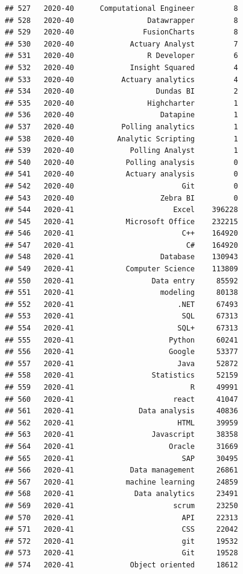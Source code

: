 \documentclass[
]{article}
\begin{document}
\begin{verbatim}
## 527   2020-40      Computational Engineer         8
## 528   2020-40                 Datawrapper         8
## 529   2020-40                FusionCharts         8
## 530   2020-40             Actuary Analyst         7
## 531   2020-40                 R Developer         6
## 532   2020-40             Insight Squared         4
## 533   2020-40           Actuary analytics         4
## 534   2020-40                   Dundas BI         2
## 535   2020-40                 Highcharter         1
## 536   2020-40                    Datapine         1
## 537   2020-40           Polling analytics         1
## 538   2020-40          Analytic Scripting         1
## 539   2020-40             Polling Analyst         1
## 540   2020-40            Polling analysis         0
## 541   2020-40            Actuary analysis         0
## 542   2020-40                         Git         0
## 543   2020-40                    Zebra BI         0
## 544   2020-41                       Excel    396228
## 545   2020-41            Microsoft Office    232215
## 546   2020-41                         C++    164920
## 547   2020-41                          C#    164920
## 548   2020-41                    Database    130943
## 549   2020-41            Computer Science    113809
## 550   2020-41                  Data entry     85592
## 551   2020-41                    modeling     80138
## 552   2020-41                        .NET     67493
## 553   2020-41                         SQL     67313
## 554   2020-41                        SQL+     67313
## 555   2020-41                      Python     60241
## 556   2020-41                      Google     53377
## 557   2020-41                        Java     52872
## 558   2020-41                  Statistics     52159
## 559   2020-41                           R     49991
## 560   2020-41                       react     41047
## 561   2020-41               Data analysis     40836
## 562   2020-41                        HTML     39959
## 563   2020-41                  Javascript     38358
## 564   2020-41                      Oracle     31669
## 565   2020-41                         SAP     30495
## 566   2020-41             Data management     26861
## 567   2020-41            machine learning     24859
## 568   2020-41              Data analytics     23491
## 569   2020-41                       scrum     23250
## 570   2020-41                         API     22313
## 571   2020-41                         CSS     22042
## 572   2020-41                         git     19532
## 573   2020-41                         Git     19528
## 574   2020-41             Object oriented     18612

\end{verbatim}
\end{document}
